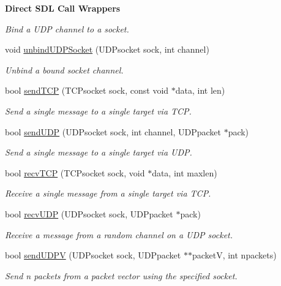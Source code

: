 \begin{Indent}{\bf Direct S\-D\-L Call Wrappers}
\begin{DoxyCompactItemize}
\begin{DoxyCompactList}\small\item\em Bind a U\-D\-P channel to a socket. \end{DoxyCompactList}\item 
void \hyperlink{classNetManager_a1f4271094319fd56f3d20151ca51234b}{unbind\-U\-D\-P\-Socket} (U\-D\-Psocket sock, int channel)
\begin{DoxyCompactList}\small\item\em Unbind a bound socket channel. \end{DoxyCompactList}\item 
bool \hyperlink{classNetManager_a570a5ce0bdbac7433fe650db23006509}{send\-T\-C\-P} (T\-C\-Psocket sock, const void $\ast$data, int len)
\begin{DoxyCompactList}\small\item\em Send a single message to a single target via T\-C\-P. \end{DoxyCompactList}\item 
bool \hyperlink{classNetManager_ac0b9e9d77a598b14b6b30dc160ead039}{send\-U\-D\-P} (U\-D\-Psocket sock, int channel, U\-D\-Ppacket $\ast$pack)
\begin{DoxyCompactList}\small\item\em Send a single message to a single target via U\-D\-P. \end{DoxyCompactList}\item 
bool \hyperlink{classNetManager_aceb9567e9ca4ca5e09dde53b771e1b59}{recv\-T\-C\-P} (T\-C\-Psocket sock, void $\ast$data, int maxlen)
\begin{DoxyCompactList}\small\item\em Receive a single message from a single target via T\-C\-P. \end{DoxyCompactList}\item 
bool \hyperlink{classNetManager_a06b0916f8e98d29429cc61d90319174b}{recv\-U\-D\-P} (U\-D\-Psocket sock, U\-D\-Ppacket $\ast$pack)
\begin{DoxyCompactList}\small\item\em Receive a message from a random channel on a U\-D\-P socket. \end{DoxyCompactList}\item 
bool \hyperlink{classNetManager_a5c1d2504835ad09e97cc2fd05ed8f83a}{send\-U\-D\-P\-V} (U\-D\-Psocket sock, U\-D\-Ppacket $\ast$$\ast$packet\-V, int npackets)
\begin{DoxyCompactList}\small\item\em Send n packets from a packet vector using the specified socket. \end{DoxyCompactList}\item 
$$
\end{DoxyCompactItemize}
\end{Indent}
